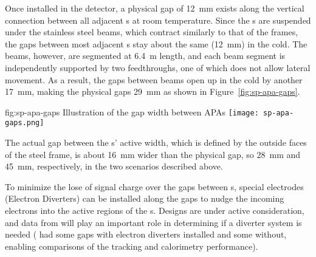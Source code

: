 

Once installed in the detector, a physical gap of \SI{12}{mm} exists along the vertical connection between all adjacent s at room temperature. Since the s are suspended under the stainless steel  beams, which contract similarly to that of the  frames, the gaps between most adjacent s stay about the same (\SI{12}{mm}) in the cold.  The  beams, however, are segmented at \SI{6.4}{m} length, and each beam segment is independently supported by two  feedthroughs, one of which does not allow lateral movement.  As a result, the gaps between  beams open up in the cold by another \SI{17}{mm},  %
making the physical gaps \SI{29}{mm} as shown in Figure~\ref{fig:sp-apa-gaps}.

\begin{dunefigure}{fig:sp-apa-gaps}
{Illustration of the gap width between APAs}  
\texttt{[image: sp-apa-gaps.png]} 
\end{dunefigure}

The actual gap between the s' active width, which is defined by the outside faces of the steel frame, is about \SI{16}{mm} wider than the physical gap, so \SI{28}{mm} and \SI{45}{mm}, respectively, in the two scenarios described above.

To minimize the lose of signal charge over the gaps between s, special electrodes (Electron Diverters) can be installed along the gaps to nudge the incoming electrons into the active regions of the s.  Designs are under active consideration, and data from  will play an important role in determining if a diverter system is needed ( had some  gaps with electron diverters installed and some without, enabling comparisons of the tracking and calorimetry performance).

